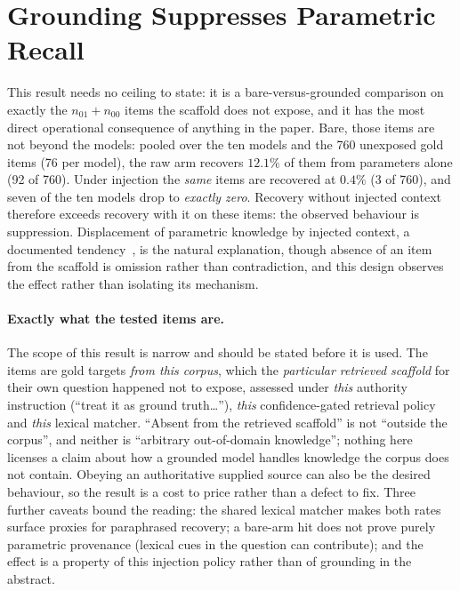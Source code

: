 \documentclass[10pt,twocolumn]{article}
\begin{document}
\section{Grounding Suppresses Parametric Recall}\label{sec:suppression}
This result needs no ceiling to state: it is a bare-versus-grounded comparison on exactly the $n_{01}+n_{00}$ items the scaffold does not expose, and it has the most direct operational consequence of anything in the paper. Bare, those items are not beyond the models: pooled over the ten models and the 760 unexposed gold items (76 per model), the raw arm recovers $\mathbf{12.1\%}$ of them from parameters alone (92 of 760). Under injection the \emph{same} items are recovered at $\mathbf{0.4\%}$ (3 of 760), and seven of the ten models drop to \emph{exactly zero}. Recovery without injected context therefore exceeds recovery with it on these items: the observed behaviour is suppression. Displacement of parametric knowledge by injected context, a documented tendency~\cite{shi2023distracted,yoran2024robust,longpre2021entity}, is the natural explanation, though absence of an item from the scaffold is omission rather than contradiction, and this design observes the effect rather than isolating its mechanism. \paragraph{Exactly what the tested items are.} The scope of this result is narrow and should be stated before it is used. The items are gold targets \emph{from this corpus}, which the \emph{particular retrieved scaffold} for their own question happened not to expose, assessed under \emph{this} authority instruction (``treat it as ground truth\ldots''), \emph{this} confidence-gated retrieval policy and \emph{this} lexical matcher. ``Absent from the retrieved scaffold'' is not ``outside the corpus'', and neither is ``arbitrary out-of-domain knowledge''; nothing here licenses a claim about how a grounded model handles knowledge the corpus does not contain. Obeying an authoritative supplied source can also be the desired behaviour, so the result is a cost to price rather than a defect to fix. Three further caveats bound the reading: the shared lexical matcher makes both rates surface proxies for paraphrased recovery; a bare-arm hit does not prove purely parametric provenance (lexical cues in the question can contribute); and the effect is a property of this injection policy rather than of grounding in the abstract.
\end{document}
